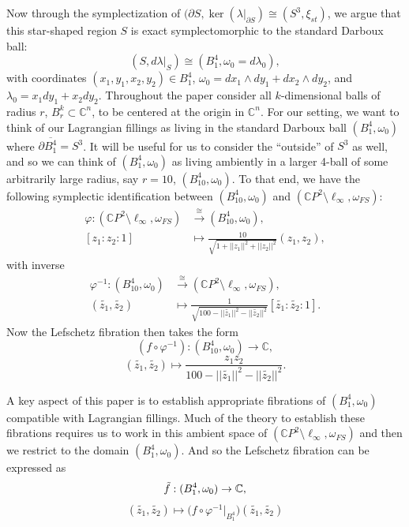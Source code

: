 \documentclass[10pt]{amsart}
\theoremstyle{plain}
\theoremstyle{definition}
\numberwithin{equation}{section}
\newcommand{\C}{\mathbb{C}}
\newcommand{\sse}{\subset}
\newcommand{\sm}{\setminus}
\newcommand{\wt}{\widetilde}
\begin{document}
Now through the symplectization of $(\partial S, \ker(\lambda|_{\partial S})\cong (S^3,\xi_{st})$, we argue that this star-shaped region $S$ is exact symplectomorphic to the standard Darboux ball:
$$(S,d\lambda|_S)\cong (B^4_1,\omega_0=d\lambda_0),$$
with coordinates $(x_1,y_1,x_2,y_2)\in B^4_1$, $\omega_0 = dx_1\wedge dy_1+dx_2\wedge dy_2$, and $\lambda_0=x_1dy_1+x_2dy_2$. Throughout the paper consider all $k$-dimensional balls of radius $r$, $B^k_r\sse \C^n$, to be centered at the origin in $\C^n$. For our setting, we want to think of our Lagrangian fillings as living in the standard Darboux ball $(B^4_1,\omega_0)$ where $\partial \overline{B^4_1} = S^3$. It will be useful for us to consider the ``outside'' of $S^3$ as well, and so we can think of $(B^4_1,\omega_0)$ as living ambiently in a larger 4-ball of some arbitrarily large radius, say $r=10$, $(B^4_{10},\omega_{0})$. To that end, we have the following symplectic identification between $(B^4_{10}, \omega_0)$ and $(\C P^2\sm \ell_\infty,\omega_{FS})$:
\begin{align*}
\varphi:(\C P^2\sm \ell_\infty,\omega_{FS})&\overset{\cong}{\to} (B^4_{10}, \omega_0),\\
[z_1:z_2:1]&\mapsto \frac{10}{\sqrt{1+||z_1||^2+||z_2||^2}}(z_1,z_2),
\end{align*}
with inverse
\begin{align*}
\varphi^{-1}:(B^4_{10}, \omega_0)&\overset{\cong}{\to} (\C P^2\sm \ell_\infty,\omega_{FS}),\\
(\wt{z_1},\wt{z_2})&\mapsto \frac{1}{\sqrt{100-||\wt{z_1}||^2-||\wt{z_2}||^2}}[\wt{z_1}:\wt{z_2}:1].
\end{align*}
Now the Lefschetz fibration then takes the form
$$(f\circ\varphi^{-1}):(B^4_{10}, \omega_0)\to\C,$$
$$(\wt{z_1},\wt{z_2})\mapsto \frac{z_1z_2}{100-||\wt{z_1}||^2-||\wt{z_2}||^2}.$$

A key aspect of this paper is to establish appropriate fibrations of $(B^4_1,\omega_0)$ compatible with Lagrangian fillings. Much of the theory to establish these fibrations requires us to work in this ambient space of $(\C P^2\sm \ell_\infty,\omega_{FS})$ and then we restrict to the domain $(B^4_1,\omega_0)$. And so the Lefschetz fibration can be expressed as
$$\Tilde{f}:(B^4_{1}, \omega_0)\to \C,$$
$$(\wt{z_1},\wt{z_2})\mapsto \big(f\circ \varphi^{-1}|_{B^4_1}\big)(\wt{z_1},\wt{z_2})$$
\end{document}
